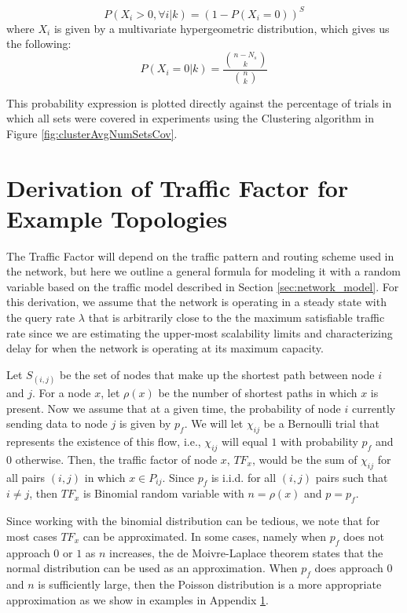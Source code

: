\begin{equation}
	P( X_i > 0 , \forall i | k) = (1 - P(X_i = 0))^{S}
\end{equation}
where $X_i$ is given by a multivariate hypergeometric distribution, which gives us the following:
\begin{equation}
	P(X_i = 0 | k) = \frac{{n-N_s \choose k}}{{n \choose k}}
\end{equation}

This probability expression is plotted directly against the percentage of trials in which all sets were covered in experiments using the Clustering algorithm in Figure \ref{fig:clusterAvgNumSetsCov}.


\section{Derivation of Traffic Factor for Example Topologies}
\label{sec:derivation_TFs}

The Traffic Factor will depend on the traffic pattern and routing scheme used in the network, but here we outline a general formula for modeling it with a random variable based on the traffic model described in Section \ref{sec:network_model}. For this derivation, we assume that the network is operating in a steady state with the query rate $\lambda$ that is arbitrarily close to the the maximum satisfiable traffic rate since we are estimating the upper-most scalability limits and characterizing delay for when the network is operating at its maximum capacity. 

Let $S_{(i,j)}$ be the set of nodes that make up the shortest path between node $i$ and $j$. For a node $x$, let $\rho(x)$ be the number of shortest paths in which $x$ is present. Now we assume that at a given time, the probability of node $i$ currently sending data to node $j$ is given by $p_f$. 
We will let $\chi_{ij}$ be a Bernoulli trial that represents the existence of this flow, i.e., $\chi_{ij}$ will equal $1$ with probability $p_f$ and $0$ otherwise. Then, the traffic factor of node $x$, $TF_x$, would be the sum of $\chi_{ij}$ for all pairs $(i,j)$ in which $x \in P_{ij}$. Since $p_f$ is i.i.d. for all $(i,j)$ pairs such that $i \neq j$, then $TF_x$ is Binomial random variable with $n=\rho(x)$ and $p=p_{f}$.

Since working with the binomial distribution can be tedious, we note that for most cases $TF_x$ can be approximated.  In some cases, namely when $p_f$ does not approach $0$ or $1$ as $n$ increases, the de Moivre-Laplace theorem states that the normal distribution can be used as an approximation.  When $p_f$ does approach $0$ and $n$ is sufficiently large, then the Poisson distribution is a more appropriate approximation as we show in examples in Appendix \ref{sec:derivation_TFs}. 

